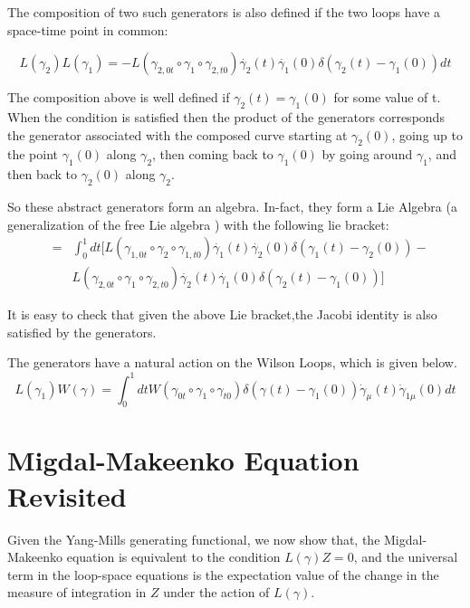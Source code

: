 \documentclass[a4paper,12]{article}
\begin{document}
The composition of two such generators is also  defined if the
two loops have a space-time point in common:

\begin{equation}
L(\gamma _2)L(\gamma _1) = -L(\gamma _{2,0t} \circ
\gamma_{1} \circ \gamma
_{2,t0})\dot{\gamma _2}(t)\dot{\gamma _1}(0)\delta(\gamma_2(t) -
\gamma_1(0))dt
\end{equation}

The composition above is well defined if $\gamma _2 (t) =  \gamma _1   
(0) $ for some value of t. When the condition is satisfied then the
product of the generators corresponds the generator associated with
the composed curve starting at $\gamma_2 (0)$,
going up to the point $\gamma _1(0)$ along $\gamma _2$, then coming back  
to $\gamma _1(0)$ by going around $\gamma _1$, and then back to $\gamma   
_2 (0)$ along $\gamma _2$.

So these abstract generators form an algebra. In-fact, they form a Lie 
Algebra (a generalization of the free Lie algebra \cite{Rajeevwilson}) 
with the following 
lie bracket:
\begin{eqnarray}
[L(\gamma_2),L(\gamma_1)] &=& \int _0 ^1dt[L(\gamma_{1,0t}\circ
\gamma_{2} \circ
\gamma_{1,t0})\dot{\gamma _1}(t)\dot{\gamma _2}(0)\delta (\gamma _1(t) -
\gamma _2(0)) - \nonumber\\
& &L(\gamma _{2,0t}
\circ \gamma _{1} \circ \gamma _{2,t0})\dot{\gamma
_2}(t)\dot{\gamma
_1}(0)\delta (\gamma _2(t) - \gamma _1(0))]
\end{eqnarray}


It is easy to check that given the above Lie bracket,the Jacobi identity 
is 
also satisfied by the 
generators.

The generators have a natural action on the Wilson Loops, which is given 
below.
\begin{equation}
L(\gamma _1)W(\gamma ) = \int _0 ^1 dt W(\gamma _{0t}\circ \gamma_1\circ 
\gamma_{t0})\delta (\gamma (t) - \gamma _1(0))\dot{\gamma }_\mu 
(t)\dot{\gamma }_{1\mu }(0)dt
\end{equation}

\section{Migdal-Makeenko Equation Revisited}
Given the Yang-Mills generating functional, we now show that, the 
Migdal-Makeenko equation is equivalent to the condition $L(\gamma )Z = 0$, 
and the universal term in the loop-space equations is the expectation value 
of the change in the measure of integration in $Z$ under the action of 
$L(\gamma )$.\\
\end{document}
